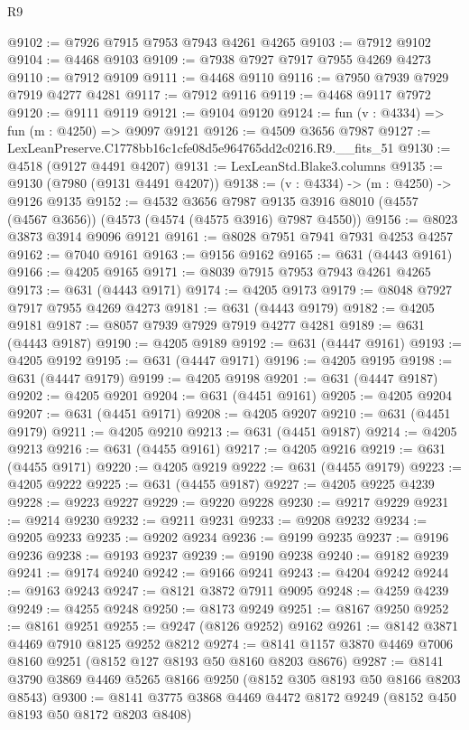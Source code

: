 \begin{lexlean}{R9}
\begin{coremodule}
@9102 := @7926 @7915 @7953 @7943 @4261 @4265
@9103 := @7912 @9102
@9104 := @4468 @9103
@9109 := @7938 @7927 @7917 @7955 @4269 @4273
@9110 := @7912 @9109
@9111 := @4468 @9110
@9116 := @7950 @7939 @7929 @7919 @4277 @4281
@9117 := @7912 @9116
@9119 := @4468 @9117 @7972
@9120 := @9111 @9119
@9121 := @9104 @9120
@9124 := fun (v : @4334) => fun (m : @4250) => @9097 @9121
@9126 := @4509 @3656 @7987
@9127 := LexLeanPreserve.C1778bb16c1cfe08d5e964765dd2c0216.R9.__fits_51
@9130 := @4518 (@9127 @4491 @4207)
@9131 := LexLeanStd.Blake3.columns
@9135 := @9130 (@7980 (@9131 @4491 @4207))
@9138 := (v : @4334) -> (m : @4250) -> @9126 @9135
@9152 := @4532
    @3656
    @7987
    @9135
    @3916
    @8010
    (@4557 (@4567 @3656))
    (@4573 (@4574 (@4575 @3916) @7987 @4550))
@9156 := @8023 @3873 @3914 @9096 @9121
@9161 := @8028 @7951 @7941 @7931 @4253 @4257
@9162 := @7040 @9161
@9163 := @9156 @9162
@9165 := @631 (@4443 @9161)
@9166 := @4205 @9165
@9171 := @8039 @7915 @7953 @7943 @4261 @4265
@9173 := @631 (@4443 @9171)
@9174 := @4205 @9173
@9179 := @8048 @7927 @7917 @7955 @4269 @4273
@9181 := @631 (@4443 @9179)
@9182 := @4205 @9181
@9187 := @8057 @7939 @7929 @7919 @4277 @4281
@9189 := @631 (@4443 @9187)
@9190 := @4205 @9189
@9192 := @631 (@4447 @9161)
@9193 := @4205 @9192
@9195 := @631 (@4447 @9171)
@9196 := @4205 @9195
@9198 := @631 (@4447 @9179)
@9199 := @4205 @9198
@9201 := @631 (@4447 @9187)
@9202 := @4205 @9201
@9204 := @631 (@4451 @9161)
@9205 := @4205 @9204
@9207 := @631 (@4451 @9171)
@9208 := @4205 @9207
@9210 := @631 (@4451 @9179)
@9211 := @4205 @9210
@9213 := @631 (@4451 @9187)
@9214 := @4205 @9213
@9216 := @631 (@4455 @9161)
@9217 := @4205 @9216
@9219 := @631 (@4455 @9171)
@9220 := @4205 @9219
@9222 := @631 (@4455 @9179)
@9223 := @4205 @9222
@9225 := @631 (@4455 @9187)
@9227 := @4205 @9225 @4239
@9228 := @9223 @9227
@9229 := @9220 @9228
@9230 := @9217 @9229
@9231 := @9214 @9230
@9232 := @9211 @9231
@9233 := @9208 @9232
@9234 := @9205 @9233
@9235 := @9202 @9234
@9236 := @9199 @9235
@9237 := @9196 @9236
@9238 := @9193 @9237
@9239 := @9190 @9238
@9240 := @9182 @9239
@9241 := @9174 @9240
@9242 := @9166 @9241
@9243 := @4204 @9242
@9244 := @9163 @9243
@9247 := @8121 @3872 @7911 @9095
@9248 := @4259 @4239
@9249 := @4255 @9248
@9250 := @8173 @9249
@9251 := @8167 @9250
@9252 := @8161 @9251
@9255 := @9247 (@8126 @9252) @9162
@9261 := @8142 @3871 @4469 @7910 @8125 @9252 @8212
@9274 := @8141 @1157 @3870 @4469 @7006 @8160 @9251 (@8152 @127 @8193 @50 @8160 @8203 @8676)
@9287 := @8141 @3790 @3869 @4469 @5265 @8166 @9250 (@8152 @305 @8193 @50 @8166 @8203 @8543)
@9300 := @8141 @3775 @3868 @4469 @4472 @8172 @9249 (@8152 @450 @8193 @50 @8172 @8203 @8408)

\end{coremodule}
\end{lexlean}

